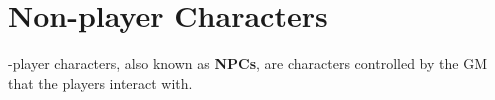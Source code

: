 \chapter{Non-player Characters}

-player characters, also known as \textbf{NPCs}, are characters controlled by the GM that the players interact with. 